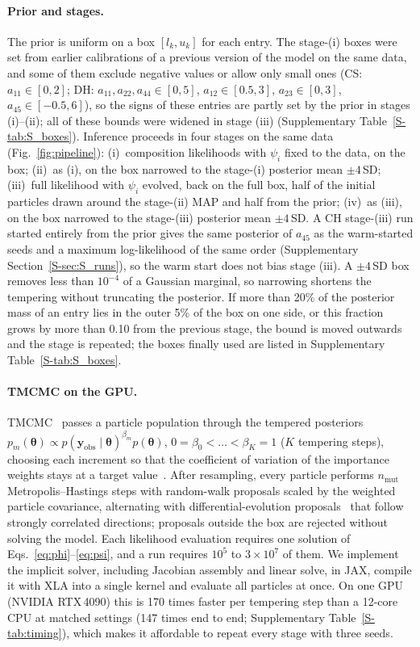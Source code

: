 \documentclass[preprint,12pt]{elsarticle}
\newcommand{\btheta}{\boldsymbol{\theta}}
\newcommand{\yobs}{\mathbf{y}_{\mathrm{obs}}}
\begin{document}
\paragraph{Prior and stages.}
The prior is uniform on a box $[l_k,u_k]$ for each entry.
The stage-(i) boxes were set from earlier calibrations of a previous version of the model on the same data, and some of them exclude negative values or allow only small ones (CS: $a_{11}\in[0,2]$; DH: $a_{11},a_{22},a_{44}\in[0,5]$, $a_{12}\in[0.5,3]$, $a_{23}\in[0,3]$, $a_{45}\in[-0.5,6]$), so the signs of these entries are partly set by the prior in stages (i)--(ii); all of these bounds were widened in stage (iii) (Supplementary Table~\ref{S-tab:S_boxes}).
Inference proceeds in four stages on the same data (Fig.~\ref{fig:pipeline}):
(i)~composition likelihoods with $\psi_i$ fixed to the data, on the box;
(ii)~as (i), on the box narrowed to the stage-(i) posterior mean $\pm4$\,SD;
(iii)~full likelihood with $\psi_i$ evolved, back on the full box, half of the initial particles drawn around the stage-(ii) MAP and half from the prior;
(iv)~as (iii), on the box narrowed to the stage-(iii) posterior mean $\pm4$\,SD.
A CH stage-(iii) run started entirely from the prior gives the same posterior of $a_{45}$ as the warm-started seeds and a maximum log-likelihood of the same order (Supplementary Section~\ref{S-sec:S_runs}), so the warm start does not bias stage (iii).
A $\pm4$\,SD box removes less than $10^{-4}$ of a Gaussian marginal, so narrowing shortens the tempering without truncating the posterior.
If more than 20\% of the posterior mass of an entry lies in the outer 5\% of the box on one side, or this fraction grows by more than 0.10 from the previous stage, the bound is moved outwards and the stage is repeated; the boxes finally used are listed in Supplementary Table~\ref{S-tab:S_boxes}.

\paragraph{TMCMC on the GPU.}
TMCMC~\citep{ChingChen2007TMCMC, DelMoral2006SMC} passes a particle population through the tempered posteriors $p_m(\btheta)\propto p(\yobs\mid\btheta)^{\beta_m}p(\btheta)$, $0=\beta_0<\dots<\beta_K=1$ ($K$ tempering steps), choosing each increment so that the coefficient of variation of the importance weights stays at a target value~\citep{Betz2016TMCMC}.
After resampling, every particle performs $n_{\mathrm{mut}}$ Metropolis--Hastings steps with random-walk proposals scaled by the weighted particle covariance, alternating with differential-evolution proposals~\citep{terBraak2006DEMC} that follow strongly correlated directions; proposals outside the box are rejected without solving the model.
Each likelihood evaluation requires one solution of Eqs.~\eqref{eq:phi}--\eqref{eq:psi}, and a run requires $10^5$ to $3\times10^7$ of them.
We implement the implicit solver, including Jacobian assembly and linear solve, in JAX, compile it with XLA into a single kernel and evaluate all particles at once.
On one GPU (NVIDIA RTX\,4090) this is 170 times faster per tempering step than a 12-core CPU at matched settings (147 times end to end; Supplementary Table~\ref{S-tab:timing}), which makes it affordable to repeat every stage with three seeds.
\end{document}
